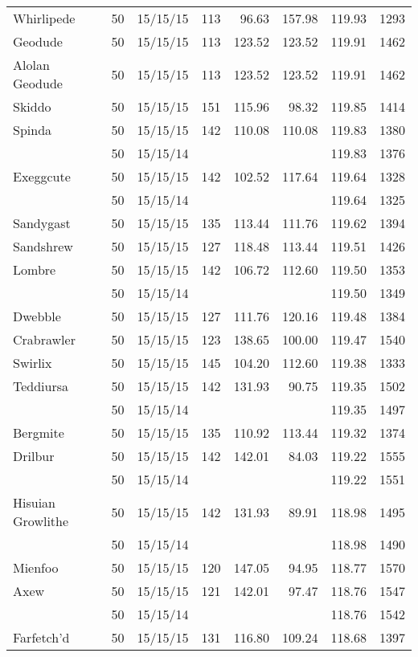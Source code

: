 \begin{longtable}{lrrrrrrr}
Whirlipede & 50 & 15/15/15 & 113 & 96.63 & 157.98 & 119.93 & 1293\\
Geodude & 50 & 15/15/15 & 113 & 123.52 & 123.52 & 119.91 & 1462\\
Alolan Geodude & 50 & 15/15/15 & 113 & 123.52 & 123.52 & 119.91 & 1462\\
Skiddo & 50 & 15/15/15 & 151 & 115.96 & 98.32 & 119.85 & 1414\\
Spinda & 50 & 15/15/15 & 142 & 110.08 & 110.08 & 119.83 & 1380\\
 & 50 & 15/15/14 & & & & 119.83 & 1376\\
Exeggcute & 50 & 15/15/15 & 142 & 102.52 & 117.64 & 119.64 & 1328\\
 & 50 & 15/15/14 & & & & 119.64 & 1325\\
Sandygast & 50 & 15/15/15 & 135 & 113.44 & 111.76 & 119.62 & 1394\\
Sandshrew & 50 & 15/15/15 & 127 & 118.48 & 113.44 & 119.51 & 1426\\
Lombre & 50 & 15/15/15 & 142 & 106.72 & 112.60 & 119.50 & 1353\\
 & 50 & 15/15/14 & & & & 119.50 & 1349\\
Dwebble & 50 & 15/15/15 & 127 & 111.76 & 120.16 & 119.48 & 1384\\
Crabrawler & 50 & 15/15/15 & 123 & 138.65 & 100.00 & 119.47 & 1540\\
Swirlix & 50 & 15/15/15 & 145 & 104.20 & 112.60 & 119.38 & 1333\\
Teddiursa & 50 & 15/15/15 & 142 & 131.93 & 90.75 & 119.35 & 1502\\
 & 50 & 15/15/14 & & & & 119.35 & 1497\\
Bergmite & 50 & 15/15/15 & 135 & 110.92 & 113.44 & 119.32 & 1374\\
Drilbur & 50 & 15/15/15 & 142 & 142.01 & 84.03 & 119.22 & 1555\\
 & 50 & 15/15/14 & & & & 119.22 & 1551\\
Hisuian Growlithe & 50 & 15/15/15 & 142 & 131.93 & 89.91 & 118.98 & 1495\\
 & 50 & 15/15/14 & & & & 118.98 & 1490\\
Mienfoo & 50 & 15/15/15 & 120 & 147.05 & 94.95 & 118.77 & 1570\\
Axew & 50 & 15/15/15 & 121 & 142.01 & 97.47 & 118.76 & 1547\\
 & 50 & 15/15/14 & & & & 118.76 & 1542\\
Farfetch'd & 50 & 15/15/15 & 131 & 116.80 & 109.24 & 118.68 & 1397\\

\end{longtable}
